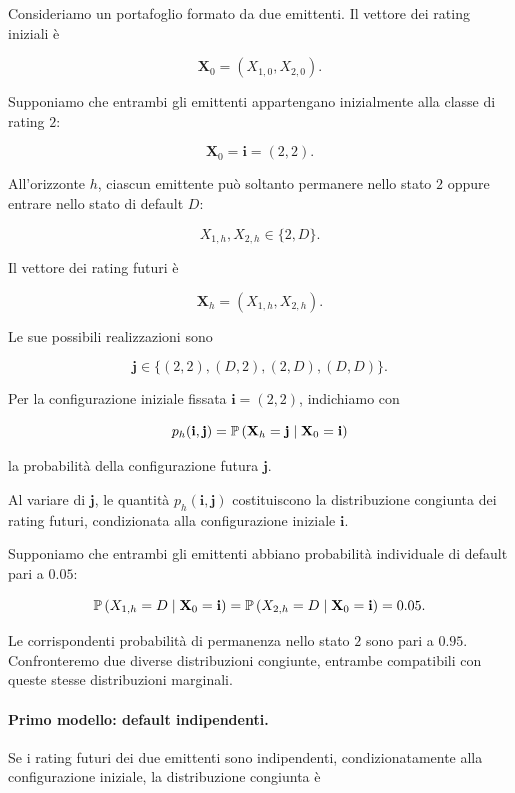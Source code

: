 \begin{example}

Consideriamo un portafoglio formato da due emittenti. Il vettore dei
rating iniziali \`{e}

\[
\mathbf{X}_0
=
\left(
X_{1,0},
X_{2,0}
\right).
\]

Supponiamo che entrambi gli emittenti appartengano inizialmente alla
classe di rating $2$:

\[
\mathbf{X}_0
=
\mathbf{i}
=
(2,2).
\]

All'orizzonte $h$, ciascun emittente pu\`{o} soltanto permanere nello
stato $2$ oppure entrare nello stato di default $D$:

\[
X_{1,h},X_{2,h}
\in
\{2,D\}.
\]

Il vettore dei rating futuri \`{e}

\[
\mathbf{X}_h
=
\left(
X_{1,h},
X_{2,h}
\right).
\]

Le sue possibili realizzazioni sono

\[
\mathbf{j}
\in
\{
(2,2),
(D,2),
(2,D),
(D,D)
\}.
\]

Per la configurazione iniziale fissata $\mathbf{i}=(2,2)$, indichiamo
con

\[
p_h(\mathbf{i},\mathbf{j})
=
\mathbb{P}
\left(
\mathbf{X}_h=\mathbf{j}
\mid
\mathbf{X}_0=\mathbf{i}
\right)
\]

la probabilit\`{a} della configurazione futura $\mathbf{j}$.

Al variare di $\mathbf{j}$, le quantit\`{a}
$p_h(\mathbf{i},\mathbf{j})$ costituiscono la distribuzione congiunta
dei rating futuri, condizionata alla configurazione iniziale
$\mathbf{i}$.

Supponiamo che entrambi gli emittenti abbiano probabilit\`{a}
individuale di default pari a $0.05$:

\[
\mathbb{P}
\left(
X_{1,h}=D
\mid
\mathbf{X}_0=\mathbf{i}
\right)
=
\mathbb{P}
\left(
X_{2,h}=D
\mid
\mathbf{X}_0=\mathbf{i}
\right)
=
0.05.
\]

Le corrispondenti probabilit\`{a} di permanenza nello stato $2$ sono
pari a $0.95$. Confronteremo due diverse distribuzioni congiunte,
entrambe compatibili con queste stesse distribuzioni marginali.

\paragraph{Primo modello: default indipendenti.}

Se i rating futuri dei due emittenti sono indipendenti,
condizionatamente alla configurazione iniziale, la distribuzione
congiunta \`{e}


\end{example}
